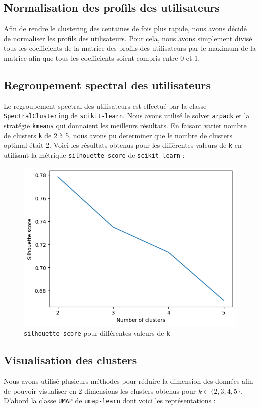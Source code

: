 \documentclass{article}
\begin{document}
\subsection{Normalisation des profils des utilisateurs}
Afin de rendre le clustering des centaines de fois plus rapide, nous avons
décidé de normaliser les profils des utilisateurs. Pour cela, nous avons
simplement divisé tous les coefficients de la matrice des profils des utilisateurs
par le maximum de la matrice afin que tous les coefficients soient compris
entre 0 et 1.

\subsection{Regroupement spectral des utilisateurs}
Le regroupement spectral des utilisateurs est effectué par la classe
\texttt{SpectralClustering} de \texttt{scikit-learn}. Nous avons utilisé le solver
\texttt{arpack} et la stratégie \texttt{kmeans} qui donnaient les meilleurs
résultats.
\vskip 0.25cm
En faisant varier nombre de clusters \texttt{k} de 2 à 5, nous avons pu determiner
que le nombre de clusters optimal était 2. Voici les résultats obtenus pour
les différentes valeurs de \texttt{k} en utilisant la métrique \texttt{silhouette\_score}
de \texttt{scikit-learn} :

\begin{figure}[ht]
  \centering
  \includegraphics[width=1\textwidth]{img/silhouette_graph.png}
  \caption{\texttt{silhouette\_score} pour différentes valeurs de \texttt{k}}
\end{figure}

\subsection{Visualisation des clusters}
Nous avons utilisé plusieurs méthodes pour réduire la dimension des données
afin de pouvoir visualiser en 2 dimensions les clusters obtenus pour 
\texttt{$k \in \{2, 3, 4, 5\}$}.
\vskip 0.25cm
D'abord la classe \texttt{UMAP} de \texttt{umap-learn} dont voici les représentations :
\end{document}
